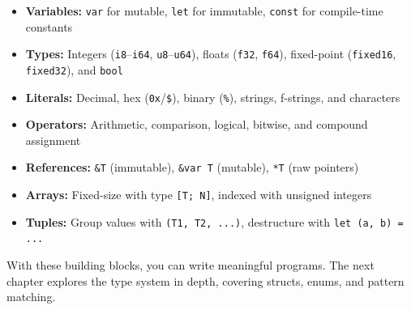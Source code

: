 \begin{itemize}
    \item \textbf{Variables:} \texttt{var} for mutable, \texttt{let} for immutable, \texttt{const} for compile-time constants
    \item \textbf{Types:} Integers (\texttt{i8}--\texttt{i64}, \texttt{u8}--\texttt{u64}), floats (\texttt{f32}, \texttt{f64}), fixed-point (\texttt{fixed16}, \texttt{fixed32}), and \texttt{bool}
    \item \textbf{Literals:} Decimal, hex (\texttt{0x}/\texttt{\$}), binary (\texttt{\%}), strings, f-strings, and characters
    \item \textbf{Operators:} Arithmetic, comparison, logical, bitwise, and compound assignment
    \item \textbf{References:} \texttt{\&T} (immutable), \texttt{\&var T} (mutable), \texttt{*T} (raw pointers)
    \item \textbf{Arrays:} Fixed-size with type \texttt{[T; N]}, indexed with unsigned integers
    \item \textbf{Tuples:} Group values with \texttt{(T1, T2, ...)}, destructure with \texttt{let (a, b) = ...}
\end{itemize}

With these building blocks, you can write meaningful programs. The next chapter explores the type system in depth, covering structs, enums, and pattern matching.
